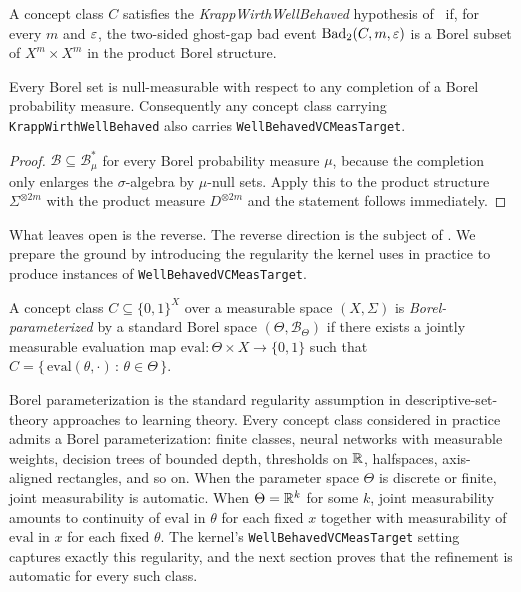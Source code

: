 \begin{defn}[KrappWirthWellBehaved]
\label{def:krapp-wirth}
  \leanok
A concept class $C$ satisfies the \emph{KrappWirthWellBehaved}
hypothesis of~\cite{KrappWirth2024} if, for every $m$ and $\varepsilon$, the
two-sided ghost-gap bad event $\mathrm{Bad}_2(C, m, \varepsilon)$ is a Borel
subset of $X^m \times X^m$ in the product Borel structure.
\end{defn}

\begin{prop}
\label{prop:kw-implies-wbvc}
  \leanok
Every Borel set is null-measurable with respect to any completion of
a Borel probability measure. Consequently any concept class carrying
\texttt{KrappWirthWellBehaved} also carries
\texttt{WellBehavedVCMeasTarget}.
\end{prop}

\begin{proof}
$\mathcal{B} \subseteq \mathcal{B}_\mu^\ast$ for every Borel
probability measure $\mu$, because the completion only enlarges the
$\sigma$-algebra by $\mu$-null sets. Apply this to the product
structure $\Sigma^{\otimes 2m}$ with the product measure
$D^{\otimes 2m}$ and the statement follows immediately.
\end{proof}

What  leaves open is the reverse. The
reverse direction is the subject of . We
prepare the ground by introducing the regularity the kernel uses in
practice to produce instances of \texttt{WellBehavedVCMeasTarget}.

\begin{defn}
\label{def:borel-param}
A concept class $C \subseteq \{0,1\}^X$ over a measurable space
$(X, \Sigma)$ is \emph{Borel-parameterized} by a standard Borel space
$(\Theta, \mathcal{B}_\Theta)$ if there exists a jointly measurable
evaluation map
$\mathrm{eval} : \Theta \times X \to \{0,1\}$
such that
$C = \bigl\{\,\mathrm{eval}(\theta, \cdot)\,:\,\theta \in \Theta\,\bigr\}$.
\end{defn}

Borel parameterization is the standard regularity assumption in
descriptive-set-theory approaches to learning theory. Every concept
class considered in practice admits a Borel parameterization: finite
classes, neural networks with measurable weights, decision trees of
bounded depth, thresholds on $\mathbb{R}$, halfspaces, axis-aligned rectangles,
and so on. When the parameter space $\Theta$ is discrete or finite,
joint measurability is automatic. When $\Theta = \mathbb{R}^k$ for some
$k$, joint measurability amounts to continuity of $\mathrm{eval}$ in
$\theta$ for each fixed $x$ together with measurability of
$\mathrm{eval}$ in $x$ for each fixed $\theta$. The kernel's
\texttt{WellBehavedVCMeasTarget} setting captures exactly this
regularity, and the next section proves that the refinement is
automatic for every such class.

